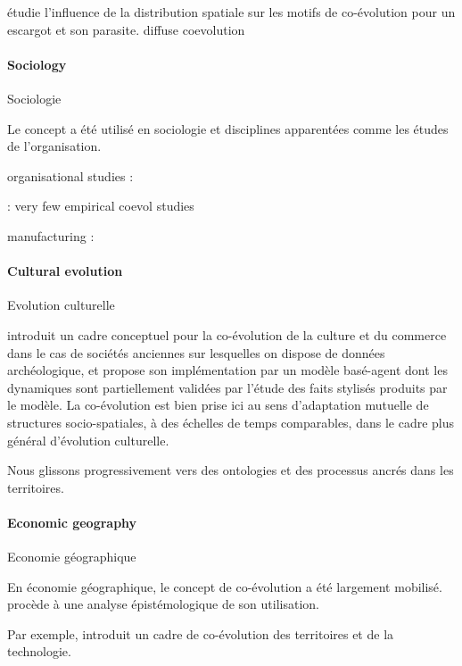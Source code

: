 \cite{dybdahl1996geography} étudie l'influence de la distribution spatiale sur les motifs de co-évolution pour un escargot et son parasite.
\cite{strauss2005toward} diffuse coevolution





\paragraph{Sociology}{Sociologie}

Le concept a été utilisé en sociologie et disciplines apparentées comme les études de l'organisation. 

organisational studies :

\cite{volberda2003co} : very few empirical coevol studies

manufacturing :

\cite{tolio2010species}


\paragraph{Cultural evolution}{Evolution culturelle}

\cite{Mesoudi25072017}

\cite{carrignon2015modelling} introduit un cadre conceptuel pour la co-évolution de la culture et du commerce dans le cas de sociétés anciennes sur lesquelles on dispose de données archéologique, et propose son implémentation par un modèle basé-agent dont les dynamiques sont partiellement validées par l'étude des faits stylisés produits par le modèle. La co-évolution est bien prise ici au sens d'adaptation mutuelle de structures socio-spatiales, à des échelles de temps comparables, dans le cadre plus général d'évolution culturelle.


Nous glissons progressivement vers des ontologies et des processus ancrés dans les territoires.


\paragraph{Economic geography}{Economie géographique}

En économie géographique, le concept de co-évolution a été largement mobilisé. \cite{schamp201020} procède à une analyse épistémologique de son utilisation.

Par exemple, \cite{colletis2010co} introduit un cadre de co-évolution des territoires et de la technologie. 

